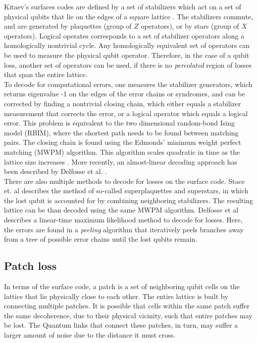 Kitaev's surfaces codes are defined by a set of stabilizers which act on a set of physical qubits that lie on the edges of a square lattice \cite{kitaev}. The stabilizers commute, and are generated by plaquettes (group of $Z$ operators), or by stars (group of $X$ operators). Logical operates corresponds to a set of stabilizer operators along a homologically nontrivial cycle. Any homologically equivalent set of operators can be used to measure the physical qubit operator. Therefore, in the case of a qubit loss, another set of operators can be used, if there is no \emph{percolated} region of losses that span the entire lattice. \\

To decode for computational errors, one measures the stabilizer generators, which returns eigenvalue -1 on the edges of the error chains or syndromes, and can be corrected by finding a nontrivial closing chain, which either equals a stabilizer measurement that corrects the error, or a logical operator which equals a logical error. This problem is equivalent to the two dimensional random-bond Ising model (RBIM), where the shortest path needs to be found between matching pairs. The closing chain is found using the Edmonds' minimum weight perfect matching (MWPM) algorithm. This algorithm scales quadratic in time as the lattice size increases \cite{stace2009}. More recently, an almost-linear decoding approach has been described by Delfosse et al. \cite{nickerson2017}. \\

There are also multiple methods to decode for losses on the surface code. Stace et. al \cite{stace2009,stace2010} describes the method of so-called superplaquettes and superstars, in which the lost qubit is accounted for by combining neighboring stabilizers. The resulting lattice can be than decoded using the same MWPM algorithm. Delfosse et al \cite{delfosse2017} describes a linear-time maximum likelihood method to decode for losses. Here, the errors are found in a \emph{peeling} algorithm that iteratively peels branches away from a tree of possible error chains until the lost qubits remain.

\subsection*{Patch loss}
In terms of the surface code, a patch is a set of neighboring qubit cells on the lattice that lie physically close to each other. The entire lattice is built by connecting multiple patches. It is possible that cells within the same patch suffer the same decoherence, due to their physical vicinity, such that entire patches may be lost. The Quantum links that connect these patches, in turn, may suffer a larger amount of noise due to the distance it must cross. \\

